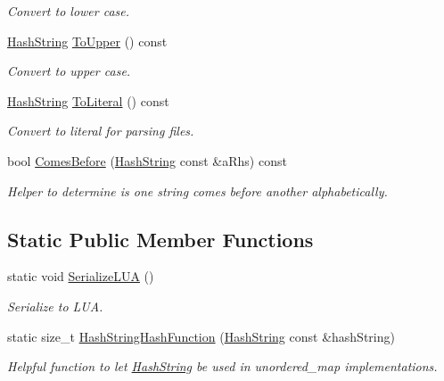 \begin{DoxyCompactItemize}
\begin{DoxyCompactList}\small\item\em Convert to lower case. \end{DoxyCompactList}\item 
\hyperlink{classHashString}{Hash\+String} \hyperlink{classHashString_a57ca9f4f4c7a767ba4ec10bcdc08ba8a}{To\+Upper} () const 
\begin{DoxyCompactList}\small\item\em Convert to upper case. \end{DoxyCompactList}\item 
\hyperlink{classHashString}{Hash\+String} \hyperlink{classHashString_ac5e9076923f7b3bc952c7357833ae7dc}{To\+Literal} () const 
\begin{DoxyCompactList}\small\item\em Convert to literal for parsing files. \end{DoxyCompactList}\item 
bool \hyperlink{classHashString_a5b6dd7dbecfdb4f6411868929dab8d8b}{Comes\+Before} (\hyperlink{classHashString}{Hash\+String} const \&a\+Rhs) const 
\begin{DoxyCompactList}\small\item\em Helper to determine is one string comes before another alphabetically. \end{DoxyCompactList}\end{DoxyCompactItemize}
\subsection*{Static Public Member Functions}
\begin{DoxyCompactItemize}
\item 
static void \hyperlink{classHashString_a7f212fc6f9284535a00aa3a8f783eaf1}{Serialize\+L\+UA} ()
\begin{DoxyCompactList}\small\item\em Serialize to L\+UA. \end{DoxyCompactList}\item 
static size\+\_\+t \hyperlink{classHashString_a1eca0930113a1553e9d88977d226830f}{Hash\+String\+Hash\+Function} (\hyperlink{classHashString}{Hash\+String} const \&hash\+String)
\begin{DoxyCompactList}\small\item\em Helpful function to let \hyperlink{classHashString}{Hash\+String} be used in unordered\+\_\+map implementations. \end{DoxyCompactList}\end{DoxyCompactItemize}
